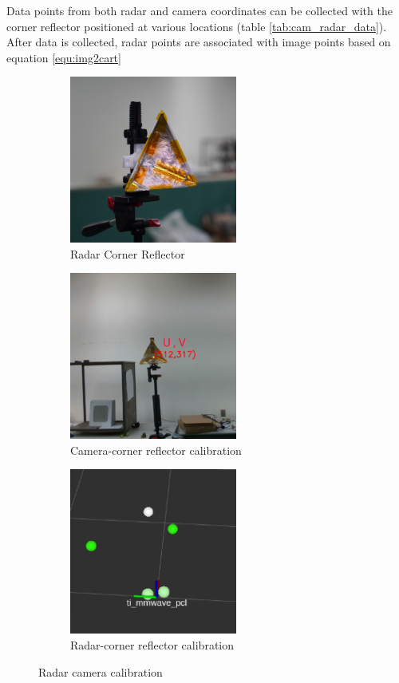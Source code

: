 Data points from both radar and camera coordinates can be collected with the corner reflector positioned at various locations
(table \ref{tab:cam_radar_data}).
After data is collected, radar points are associated with image points based on equation \ref*{equ:img2cart}
\begin{figure}[hbpt]
    \centering
    \begin{subfigure}{0.25\linewidth}
        \includegraphics[width=5.5cm]{Figures/corner_reflector.jpg}
        \caption{Radar Corner Reflector}
        \label{subfig:corner_reflector_fig}
    \end{subfigure}
    \hfill
    \begin{subfigure}{0.25\linewidth}
        \centering
        \includegraphics[width=5.5cm]{Figures/camera_corner.png}
        \caption{Camera-corner reflector calibration}
        \label{subfig:camera_view_fig}
    \end{subfigure}
    \hfill
    \begin{subfigure}{0.25\linewidth}
        \centering
        \includegraphics[width=5.5cm]{Figures/radar_corner.png}
        \caption{Radar-corner reflector calibration}
        \label{subfig:radar_view_fig}
    \end{subfigure}

    \caption{Radar camera calibration}
    \label{fig:radar_camera_calibration}
\end{figure}


